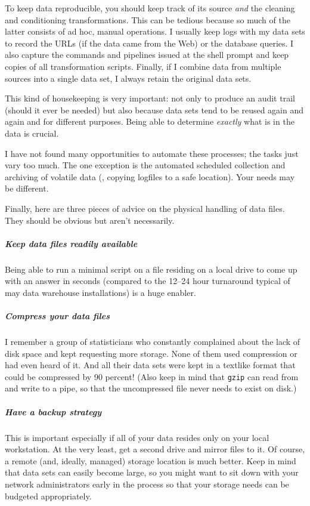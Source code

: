 To keep data reproducible, you should keep track of its source
\emph{and} the cleaning and conditioning transformations.  This can be
tedious because so much of the latter consists of ad hoc, manual
operations. I usually keep logs with my data sets to record the URLs
(if the data came from the Web) or the database queries. I also
capture the commands and pipelines issued at the shell prompt and keep
copies of all transformation scripts.  Finally, if I combine data from
multiple sources into a single data set, I always retain the original
data sets.

This kind of housekeeping is very important: not only to produce an
audit trail (should it ever be needed) but also because data sets
tend to be reused again and again and for different purposes.  Being
able to determine \emph{exactly} what is in the data is crucial.

I have not found many opportunities to automate these processes; the
tasks just vary too much. The one exception is the automated scheduled
collection and archiving of volatile data (\eg, copying logfiles to a
safe location). Your needs may be different.

Finally, here are three pieces of advice on the physical handling of
data files. They should be obvious but aren't necessarily.
\begin{unnumlist}
\subparagraph{Keep data files readily available} 
\item Being able to run a minimal
  script on a file residing on a local drive to come up with an answer
  in seconds (compared to the 12--24 hour turnaround typical of may
  data warehouse installations) is a huge enabler.

\subparagraph{Compress your data files} 
\item I remember a group of statisticians  
  who constantly complained about the lack of disk space and kept
  requesting more\vadjust{\pagebreak} storage. None of them used compression or had even
  heard of it. And all their data sets were kept in a textlike format
  that could be compressed by 90 percent! (Also keep in mind that
  \texttt{gzip} can read from and write to a pipe, so that the
  uncompressed file never needs to exist on disk.)

\subparagraph{Have a backup strategy}
\item  This is important especially if all of  
  your data resides only on your local workstation. At the very least,
  get a second drive and mirror files to it. Of course, a remote (and,
  ideally, managed) storage location is much better. Keep in mind that
  data sets can easily become large, so you might want to sit down
  with your network administrators early in the process so that your
  storage needs can be budgeted appropriately.
\end{unnumlist}

